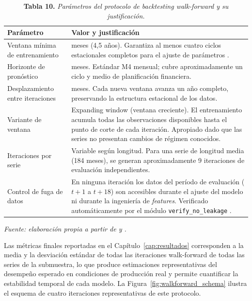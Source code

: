 \begin{table}[H]
\caption{\textbf{Tabla 10.} \textit{Parámetros del protocolo de backtesting walk-forward y su justificación.}}
\label{tab:protocolo}
\vspace{4pt}
\begin{tabular}{>{\raggedright\arraybackslash}p{4.5cm} >{\raggedright\arraybackslash}p{9cm}}
\toprule
\textbf{Parámetro} & \textbf{Valor y justificación} \\
\midrule
Ventana mínima de entrenamiento & 54 meses (4,5 años). Garantiza al menos cuatro ciclos estacionales completos para el ajuste de parámetros \parencite{Hyndman2021}. \\
Horizonte de pronóstico & 18 meses. Estándar M4 mensual; cubre aproximadamente un ciclo y medio de planificación financiera. \\
Desplazamiento entre iteraciones & 12 meses. Cada nueva ventana avanza un año completo, preservando la estructura estacional de los datos. \\
Variante de ventana & Expanding window (ventana creciente). El entrenamiento acumula todas las observaciones disponibles hasta el punto de corte de cada iteración. Apropiado dado que las series no presentan cambios de régimen conocidos. \\
Iteraciones por serie & Variable según longitud. Para una serie de longitud media (184 meses), se generan aproximadamente 9 iteraciones de evaluación independientes. \\
Control de fuga de datos & En ninguna iteración los datos del período de evaluación ($t+1$ a $t+18$) son accesibles durante el ajuste del modelo ni durante la ingeniería de \textit{features}. Verificado automáticamente por el módulo \texttt{verify\_no\_leakage} \parencite{Bergmeir2012}. \\
\bottomrule
\end{tabular}
\vspace{4pt}

\small\textit{Fuente: elaboración propia a partir de \textcite{Bergmeir2012} y \textcite{Hyndman2021}.}
\end{table}

Las métricas finales reportadas en el Capítulo~\ref{cap:resultados} corresponden a la media y la desviación estándar de todas las iteraciones walk-forward de todas las series de la submuestra, lo que produce estimaciones representativas del desempeño esperado en condiciones de producción real y permite cuantificar la estabilidad temporal de cada modelo. La Figura~\ref{fig:walkforward_schema} ilustra el esquema de cuatro iteraciones representativas de este protocolo.

